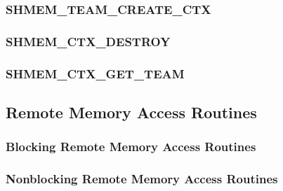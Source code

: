 \documentclass[10pt,oneside]{book}
\begin{document}
\subsubsection{\textbf{SHMEM\_TEAM\_CREATE\_CTX}}
\label{subsec:shmem_team_create_ctx}


\subsubsection{\textbf{SHMEM\_CTX\_DESTROY}}
\label{subsec:shmem_ctx_destroy}


\subsubsection{\textbf{SHMEM\_CTX\_GET\_TEAM}}
\label{subsec:shmem_ctx_get_team}


\subsection{Remote Memory Access Routines}\label{sec:rma}


\subsubsection{Blocking Remote Memory Access Routines}\label{subsec:rma}
\label{subsec:shmem_put}


\label{subsec:shmem_p}


\label{subsec:shmem_iput}


\label{subsec:shmem_ibput}


\label{subsec:shmem_get}


\label{subsec:shmem_g}


\label{subsec:shmem_iget}


\label{subsec:shmem_ibget}


\subsubsection{Nonblocking Remote Memory Access Routines}\label{subsec:rma_nbi}
\end{document}
